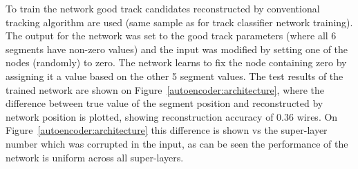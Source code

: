 To train the network good track candidates reconstructed by conventional tracking algorithm are used (same sample 
as for track classifier network training). The output for the network was set to the good track parameters (where all 6 
segments have non-zero values) and the input was modified by setting one of the nodes (randomly) to zero. The network
learns to fix the node containing zero by assigning it a value based on the other 5 segment values. The test results 
of the trained network are shown on Figure~\ref{autoencoder:architecture}, where the difference between true value 
of the segment position and reconstructed by network position is plotted, showing reconstruction accuracy of $0.36$ wires.
On Figure~\ref{autoencoder:architecture} this difference is shown vs the super-layer number which was corrupted in the input, 
as can be seen the performance of the network is uniform across all super-layers.



